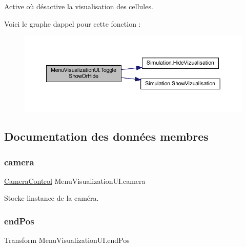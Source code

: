 Active où désactive la visualisation des cellules. 

Voici le graphe d\textquotesingle{}appel pour cette fonction \+:\nopagebreak
\begin{figure}[H]
\begin{center}
\leavevmode
\includegraphics[width=350pt]{class_menu_visualization_u_i_acc1ed888dd19359811e473ffbd2fa86a_cgraph}
\end{center}
\end{figure}


\subsection{Documentation des données membres}
\mbox{\label{class_menu_visualization_u_i_acbeec950a81f60bf3cd493d9e4a99896}} 
\subsubsection{\texorpdfstring{camera}{camera}}
{\footnotesize\ttfamily \mbox{\hyperlink{class_camera_control}{Camera\+Control}} Menu\+Visualization\+U\+I.\+camera\hspace{0.3cm}{\ttfamily [private]}}



Stocke l\textquotesingle{}instance de la caméra. 

\mbox{\label{class_menu_visualization_u_i_aca26bc81a47e95274e282b0688d48ab0}} 
\subsubsection{\texorpdfstring{end\+Pos}{endPos}}
{\footnotesize\ttfamily Transform Menu\+Visualization\+U\+I.\+end\+Pos\hspace{0.3cm}{\ttfamily [private]}}



